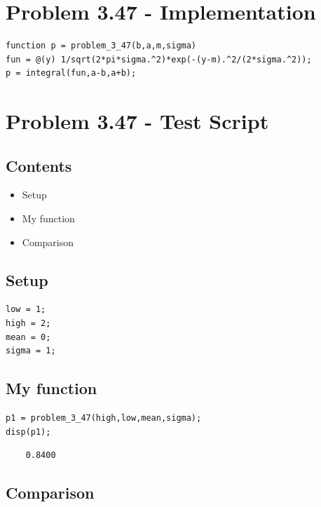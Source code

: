 \documentclass[12pt]{article}
\begin{document}
\newpage
\section*{Problem 3.47 - Implementation}

\begin{verbatim}
function p = problem_3_47(b,a,m,sigma)
fun = @(y) 1/sqrt(2*pi*sigma.^2)*exp(-(y-m).^2/(2*sigma.^2));
p = integral(fun,a-b,a+b);
\end{verbatim}

\section*{Problem 3.47 - Test Script}

\subsection*{Contents}

\begin{itemize}
\setlength{\itemsep}{-1ex}
   \item Setup
   \item My function
   \item Comparison
\end{itemize}

\subsection*{Setup}

\begin{verbatim}
low = 1;
high = 2;
mean = 0;
sigma = 1;
\end{verbatim}

\subsection*{My function}

\begin{verbatim}
p1 = problem_3_47(high,low,mean,sigma);
disp(p1);
\end{verbatim}

        \color{lightgray} \begin{verbatim}    0.8400

\end{verbatim} \color{black}

\subsection*{Comparison}
\end{document}
